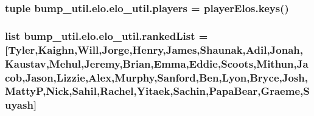 \subsubsection[{players}]{\setlength{\rightskip}{0pt plus 5cm}tuple bump\+\_\+util.\+elo.\+elo\+\_\+util.\+players = player\+Elos.\+keys()}\label{namespacebump__util_1_1elo_1_1elo__util_a15699928188d60536539e4b3acee209d}
\hypertarget{namespacebump__util_1_1elo_1_1elo__util_ab17f3f7dc79c0595109f66423f82f9e9}{}
\subsubsection[{ranked\+List}]{\setlength{\rightskip}{0pt plus 5cm}list bump\+\_\+util.\+elo.\+elo\+\_\+util.\+ranked\+List = \mbox{[}\textquotesingle{}Tyler\textquotesingle{},\textquotesingle{}Kaighn\textquotesingle{},\textquotesingle{}Will\textquotesingle{},\textquotesingle{}Jorge\textquotesingle{},\textquotesingle{}Henry\textquotesingle{},\textquotesingle{}James\textquotesingle{},\textquotesingle{}Shaunak\textquotesingle{},\textquotesingle{}Adil\textquotesingle{},\textquotesingle{}Jonah\textquotesingle{},\textquotesingle{}Kaustav\textquotesingle{},\textquotesingle{}Mehul\textquotesingle{},\textquotesingle{}Jeremy\textquotesingle{},\textquotesingle{}Brian\textquotesingle{},\textquotesingle{}Emma\textquotesingle{},\textquotesingle{}Eddie\textquotesingle{},\textquotesingle{}Scoots\textquotesingle{},\textquotesingle{}Mithun\textquotesingle{},\textquotesingle{}Jacob\textquotesingle{},\textquotesingle{}Jason\textquotesingle{},\textquotesingle{}Lizzie\textquotesingle{},\textquotesingle{}Alex\textquotesingle{},\textquotesingle{}Murphy\textquotesingle{},\textquotesingle{}Sanford\textquotesingle{},\textquotesingle{}Ben\textquotesingle{},\textquotesingle{}Lyon\textquotesingle{},\textquotesingle{}Bryce\textquotesingle{},\textquotesingle{}Josh\textquotesingle{},\textquotesingle{}Matty\+P\textquotesingle{},\textquotesingle{}Nick\textquotesingle{},\textquotesingle{}Sahil\textquotesingle{},\textquotesingle{}Rachel\textquotesingle{},\textquotesingle{}Yitaek\textquotesingle{},\textquotesingle{}Sachin\textquotesingle{},\textquotesingle{}Papa\+Bear\textquotesingle{},\textquotesingle{}Graeme\textquotesingle{},\textquotesingle{}Suyash\textquotesingle{}\mbox{]}}\label{namespacebump__util_1_1elo_1_1elo__util_ab17f3f7dc79c0595109f66423f82f9e9}
